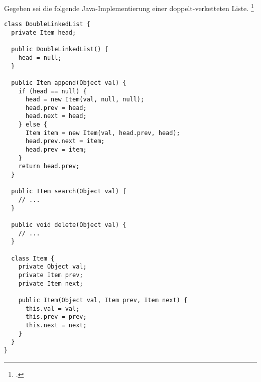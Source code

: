 \documentclass{lehramt-informatik-aufgabe}
\begin{document}

\let\j=\liJavaCode

Gegeben sei die folgende Java-Implementierung einer doppelt-verketteten
Liste.
\footcite{examen:66115:2021:03}

\begin{verbatim}
class DoubleLinkedList {
  private Item head;

  public DoubleLinkedList() {
    head = null;
  }

  public Item append(Object val) {
    if (head == null) {
      head = new Item(val, null, null);
      head.prev = head;
      head.next = head;
    } else {
      Item item = new Item(val, head.prev, head);
      head.prev.next = item;
      head.prev = item;
    }
    return head.prev;
  }

  public Item search(Object val) {
    // ...
  }

  public void delete(Object val) {
    // ...
  }

  class Item {
    private Object val;
    private Item prev;
    private Item next;

    public Item(Object val, Item prev, Item next) {
      this.val = val;
      this.prev = prev;
      this.next = next;
    }
  }
}
\end{verbatim}
\end{document}
